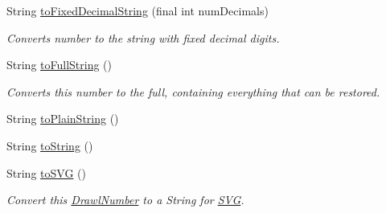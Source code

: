 \begin{DoxyCompactItemize}
String \hyperlink{interfacecom_1_1aarrelaakso_1_1drawl_1_1_number_a8e672210b2f919571e6b09d4cb95c569}{to\+Fixed\+Decimal\+String} (final int num\+Decimals)
\begin{DoxyCompactList}\small\item\em Converts number to the string with fixed decimal digits. \end{DoxyCompactList}\item 
String \hyperlink{interfacecom_1_1aarrelaakso_1_1drawl_1_1_number_accc9efbfff1dfc0ff3d6352e3c1cfd4e}{to\+Full\+String} ()
\begin{DoxyCompactList}\small\item\em Converts this number to the full, containing everything that can be restored. \end{DoxyCompactList}\item 
String \hyperlink{interfacecom_1_1aarrelaakso_1_1drawl_1_1_number_a0c6dd9fbd93fdb6d7e487f507d55ba43}{to\+Plain\+String} ()
\item 
String \hyperlink{interfacecom_1_1aarrelaakso_1_1drawl_1_1_number_a9dc0aea5633aebc8f5888b5a194dcd81}{to\+String} ()
\item 
String \hyperlink{interfacecom_1_1aarrelaakso_1_1drawl_1_1_number_a1cb9c85b621dc2669b2f52a4e82bdd3c}{to\+S\+VG} ()
\begin{DoxyCompactList}\small\item\em Convert this \hyperlink{classcom_1_1aarrelaakso_1_1drawl_1_1_drawl_number}{Drawl\+Number} to a String for \hyperlink{classcom_1_1aarrelaakso_1_1drawl_1_1_s_v_g}{S\+VG}. \end{DoxyCompactList}\end{DoxyCompactItemize}
